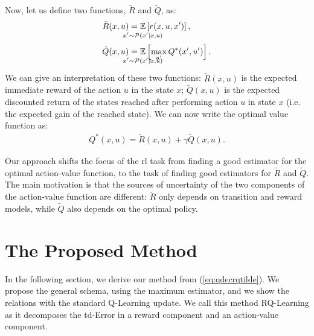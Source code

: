 Now, let us define two functions, $\tilde{R}$ and $\tilde{Q}$, as:
\begin{align}
 \tilde{R}(x,u)&=\underset{\strut\mathclap{x'\sim \mathcal{P}(x'|x,u)}}{\mathbb{E}}\left[ r(x,u,x')\right], \nonumber\ \\
 \tilde{Q}(x,u)&=\underset{\strut\mathclap{x'\sim \mathcal{P}(x'|x,u)}}{\mathbb{E}}\left[\max_{u'} Q^*(x',u')\right].
 \label{eq:rqtilde}
\end{align}
We can give an interpretation of these two functions: $\tilde{R}(x,u)$ is the expected immediate reward of the action $u$ in the state $x$; $\tilde{Q}(x,u)$ is the expected discounted return of the states reached after performing action $u$ in state $x$ (i.e. the expected gain of the reached state).
We can now write the optimal value function as:
\begin{align}
 Q^*(x,u)=\tilde{R}(x,u)+\gamma\tilde{Q}(x,u).
 \label{eq:qdecrqtilde}
\end{align}

Our approach shifts the focus of the \gls{rl} task from finding a good estimator for the optimal action-value function, to the task of finding good estimators for $\tilde{R}$ and $\tilde{Q}$. The main motivation is that the sources of uncertainty of the two components of the action-value function are different: $\tilde{R}$ only depends on transition and reward models, while $\tilde{Q}$ also depends on the optimal policy.
\section{The Proposed Method}
In the following section, we derive our method from (\ref{eq:qdecrqtilde}). We propose the general schema, using the maximum estimator, and we show the relations with the standard Q-Learning update. We call this method RQ-Learning as it decomposes the \gls{td}-Error in a reward component and an action-value component.

